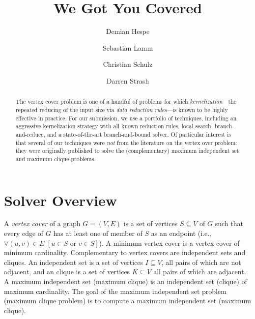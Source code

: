 \documentclass[a4paper,UKenglish]{lipics-v2016}
\newcommand{\mytitle}{We Got You Covered}
\begin{document}
\title{\mytitle}
\author[1]{Demian Hespe}
\author[2]{Sebastian Lamm}
\author[3]{Christian Schulz}
\author[4]{Darren Strash}


\date{}


\Copyright{}
\maketitle
\begin{abstract}
The vertex cover problem is one of a handful of problems for which \emph{kernelization}---the repeated reducing of the input size via \emph{data reduction rules}---is known to be highly effective in practice. For our submission, we use a portfolio of techniques, including an aggressive kernelization strategy with all known reduction rules, local search, branch-and-reduce, and a state-of-the-art branch-and-bound solver. Of particular interest is that several of our techniques were \emph{not} from the literature on the vertex over problem: they were originally published to solve the (complementary) maximum independent set and maximum clique problems.
\end{abstract}

\section{Solver Overview}

A \emph{vertex cover} of a graph $G=(V,E)$ is a set of vertices $S\subseteq V$ of $G$ such that every edge of $G$ has at least one of member of $S$ as an endpoint (i.e., $\forall (u,v) \in E\,\, [u\in S \text{ or } v \in S]$).
A minimum vertex cover is a vertex cover of minimum cardinality. 
Complementary to vertex covers are independent sets and cliques. An independent set is a set of vertices $I\subseteq V$, all pairs of which are not adjacent, and an clique is a set of vertices $K\subseteq V$ all pairs of which are adjacent. A maximum independent set (maximum clique) is an independent set (clique) of maximum cardinality. The goal of the maximum independent set problem (maximum clique problem) is to compute a maximum independent set (maximum clique).
\end{document}

